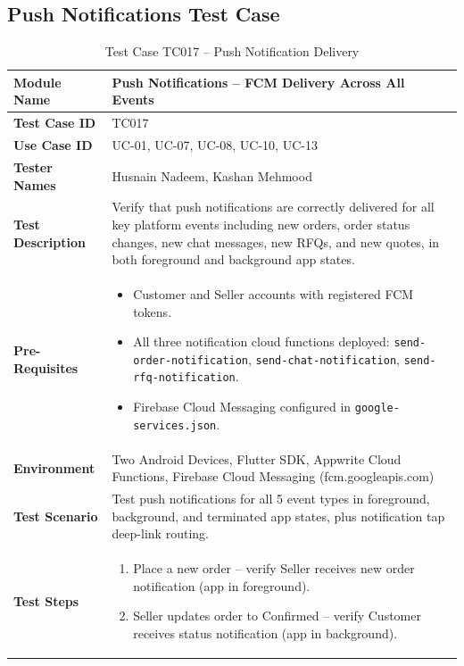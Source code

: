 \newpage
\subsection{Push Notifications Test Case}

\begin{table}[H]
\centering
\caption{Test Case TC017 -- Push Notification Delivery}
\label{tab:tc017}
\renewcommand{\arraystretch}{1.15}
\small
\begin{tabular}{|p{3.2cm}|p{10.8cm}|}
\hline
\textbf{Module Name} & Push Notifications -- FCM Delivery Across All Events \\ \hline
\textbf{Test Case ID} & TC017 \\ \hline
\textbf{Use Case ID} & UC-01, UC-07, UC-08, UC-10, UC-13 \\ \hline
\textbf{Tester Names} & Husnain Nadeem, Kashan Mehmood \\ \hline
\textbf{Test Description} & Verify that push notifications are correctly delivered for all key platform events including new orders, order status changes, new chat messages, new RFQs, and new quotes, in both foreground and background app states. \\ \hline
\textbf{Pre-Requisites} &
\begin{itemize}[leftmargin=*,noitemsep]
\item Customer and Seller accounts with registered FCM tokens.
\item All three notification cloud functions deployed: \texttt{send-order-notification}, \texttt{send-chat-notification}, \texttt{send-rfq-notification}.
\item Firebase Cloud Messaging configured in \texttt{google-services.json}.
\end{itemize} \\ \hline
\textbf{Environment} & Two Android Devices, Flutter SDK, Appwrite Cloud Functions, Firebase Cloud Messaging (fcm.googleapis.com) \\ \hline
\textbf{Test Scenario} & Test push notifications for all 5 event types in foreground, background, and terminated app states, plus notification tap deep-link routing. \\ \hline
\textbf{Test Steps} &
\begin{enumerate}[leftmargin=*,noitemsep]
\item Place a new order -- verify Seller receives new order notification (app in foreground).
\item Seller updates order to Confirmed -- verify Customer receives status notification (app in background).

\end{enumerate}
\end{tabular}
\end{table}
